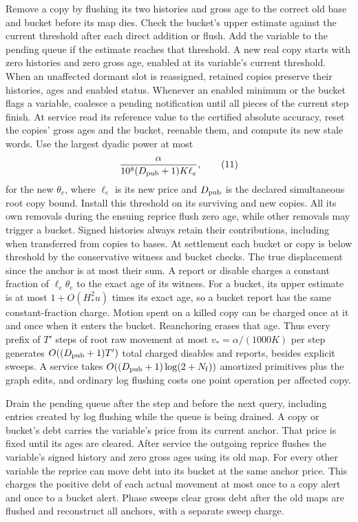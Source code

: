 \documentclass[11pt]{article}
\begin{document}
Remove a copy by flushing its two histories and gross age to the correct old base and bucket before its map dies. Check the bucket's upper estimate against the current threshold after each direct addition or flush. Add the variable to the pending queue if the estimate reaches that threshold. A new real copy starts with zero histories and zero gross age, enabled at its variable's current threshold. When an unaffected dormant slot is reassigned, retained copies preserve their histories, ages and enabled status. Whenever an enabled minimum or the bucket flags a variable, coalesce a pending notification until all pieces of the current step finish. At service read its reference value to the certified absolute accuracy, reset the copies' gross ages and the bucket, reenable them, and compute its new stale words. Use the largest dyadic power at most
\[
     \frac{\alpha}{10^8(D_{\rm pub}+1)K\ell_e},
\tag{11}
\]
for the new \(\theta_e\), where \(\ell_e\) is its new price and \(D_{\rm pub}\) is the declared simultaneous root copy bound. Install this threshold on its surviving and new copies. All its own removals during the ensuing reprice flush zero age, while other removals may trigger a bucket. Signed histories always retain their contributions, including when transferred from copies to bases. At settlement each bucket or copy is below threshold by the conservative witness and bucket checks. The true displacement since the anchor is at most their sum. A report or disable charges a constant fraction of \(\ell_e\theta_e\) to the exact age of its witness. For a bucket, its upper estimate is at most \(1+O(H_\ast^2u)\) times its exact age, so a bucket report has the same constant-fraction charge. Motion spent on a killed copy can be charged once at it and once when it enters the bucket. Reanchoring erases that age. Thus every prefix of \(T'\) steps of root raw movement at most \(v_\ast=\alpha/(1000K)\) per step generates \(O((D_{\rm pub}+1)T')\) total charged disables and reports, besides explicit sweeps. A service takes \(O((D_{\rm pub}+1)\log(2+N_{\rm f}))\) amortized primitives plus the graph edits, and ordinary log flushing costs one point operation per affected copy.

Drain the pending queue after the step and before the next query, including entries created by log flushing while the queue is being drained. A copy or bucket's debt carries the variable's price from its current anchor. That price is fixed until its ages are cleared. After service the outgoing reprice flushes the variable's signed history and zero gross ages using its old map. For every other variable the reprice can move debt into its bucket at the same anchor price. This charges the positive debt of each actual movement at most once to a copy alert and once to a bucket alert. Phase sweeps clear gross debt after the old maps are flushed and reconstruct all anchors, with a separate sweep charge.
\end{document}
